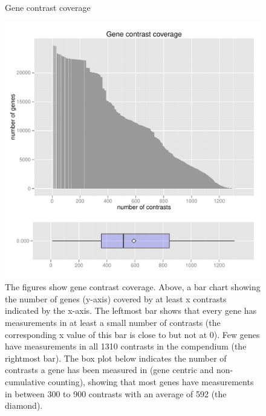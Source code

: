 \begin{figure}[t]
	\centering
	\caption{Gene contrast coverage}\label{fig:maize-accu-contrast-count}
	\includegraphics[trim=0cm 0cm 0cm 1.2cm, clip=true, 	 	
		width=1\textwidth]{ApdxB-accu_contrast_count.pdf}
	\caption*{The figures show gene contrast coverage. 
	Above, a bar chart showing the number of genes (y-axis) covered by at least 
	x contrasts indicated by the x-axis. 
	The leftmost bar shows that every gene has measurements in at least a small 
	number of contrasts (the corresponding x value of this bar is close to but 
	not at 0). 
	Few genes have measurements in all 1310 contrasts in the compendium (the 
	rightmost bar). 
	The box plot below indicates the number of contrasts a gene has been 
	measured in (gene centric and non-cumulative counting), showing that  most 
	genes have measurements in between 300 to 900 contrasts with an average of 
	592 (the diamond). }
\end{figure}

\cleardoublepage

